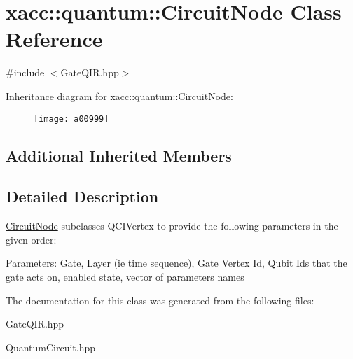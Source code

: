 \hypertarget{a00999}{}\section{xacc\+:\+:quantum\+:\+:Circuit\+Node Class Reference}
\label{a00999}


{\ttfamily \#include $<$Gate\+Q\+I\+R.\+hpp$>$}

Inheritance diagram for xacc\+:\+:quantum\+:\+:Circuit\+Node\+:\begin{figure}[H]
\begin{center}
\leavevmode
\texttt{[image: a00999]}
\end{center}
\end{figure}
\subsection*{Additional Inherited Members}


\subsection{Detailed Description}
\hyperlink{a00999}{Circuit\+Node} subclasses Q\+C\+I\+Vertex to provide the following parameters in the given order\+:

Parameters\+: Gate, Layer (ie time sequence), Gate Vertex Id, Qubit Ids that the gate acts on, enabled state, vector of parameters names 

The documentation for this class was generated from the following files\+:\begin{DoxyCompactItemize}
\item 
Gate\+Q\+I\+R.\+hpp\item 
Quantum\+Circuit.\+hpp\end{DoxyCompactItemize}
